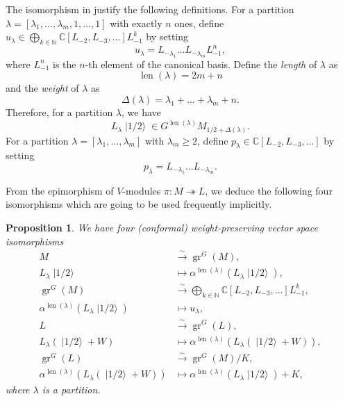 \documentclass[a4paper, 12pt, reqno]{amsart}
\newtheorem{proposition}[theorem]{Proposition}
\theoremstyle{remark}
\numberwithin{equation}{subsection}
\DeclareMathOperator{\gr}{gr}
\DeclareMathOperator{\len}{len}
\DeclareMathOperator{\vachalf}{|1/2\rangle}
\begin{document}
The isomorphism in  justify the following definitions.
For a partition $\lambda = [\lambda_1, \dots, \lambda_m, 1, \dots, 1]$ with exactly $n$ ones, define $u_{\lambda} \in \bigoplus_{k \in \mathbb{N}}\mathbb{C}[L_{-2}, L_{-3}, \dots]L_{-1}^k$ by setting
\begin{equation*}
  u_{\lambda} = L_{-\lambda_1}\dots L_{-\lambda_m}L_{-1}^n,
\end{equation*}
where $L_{-1}^n$ is the $n$-th element of the canonical basis.
Define the \emph{length} of $\lambda$ as
\begin{equation*}
  \len(\lambda) = 2m + n
\end{equation*}
and the \emph{weight} of $\lambda$ as
\begin{equation*}
  \Delta(\lambda) = \lambda_1 + \dots + \lambda_m + n.
\end{equation*}
Therefore, for a partition $\lambda$, we have
\begin{equation*}
  L_{\lambda}\vachalf \in G^{\len(\lambda)}M_{1/2 + \Delta(\lambda)}.
\end{equation*}
For a partition $\lambda = [\lambda_1, \dots, \lambda_m]$ with $\lambda_m \ge 2$, define $p_{\lambda} \in \mathbb{C}[L_{-2}, L_{-3}, \dots]$ by setting
\begin{equation*}
  p_{\lambda} = L_{-\lambda_1}\dots L_{-\lambda_m}.
\end{equation*}

From the epimorphism of $V$-modules $\pi: M \twoheadrightarrow L$, we deduce the following four isomorphisms which are going to be used frequently implicitly.

\begin{proposition}
  \label{prp:16}
  We have four (conformal) weight-preserving vector space isomorphisms
  \begin{align*}
    M &\xrightarrow{\sim} \gr^G(M), \\
    L_{\lambda}\vachalf &\mapsto \alpha^{\len(\lambda)}(L_{\lambda}\vachalf), \\
    \gr^G(M) &\xrightarrow{\sim} \bigoplus_{k \in \mathbb{N}}\mathbb{C}[L_{-2}, L_{-3}, \dots]L_{-1}^k, \\
    \alpha^{\len(\lambda)}(L_{\lambda}\vachalf) &\mapsto u_{\lambda}, \\
    L &\xrightarrow{\sim} \gr^G(L), \\
    L_{\lambda}(\vachalf + W) &\mapsto \alpha^{\len(\lambda)}(L_{\lambda}(\vachalf + W)), \\
    \gr^G(L) &\xrightarrow{\sim} \gr^G(M)/K, \\
    \alpha^{\len(\lambda)}(L_{\lambda}(\vachalf + W)) &\mapsto \alpha^{\len(\lambda)}(L_{\lambda}\vachalf) + K,
  \end{align*}
  where $\lambda$ is a partition.
\end{proposition}
\end{document}
